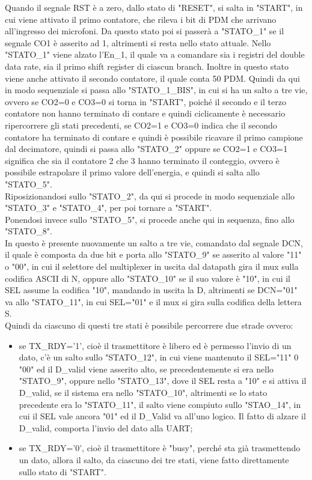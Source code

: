 \documentclass[a4paper, titlepage]{article}
\begin{document}
\noindent Quando il segnale RST è a zero, dallo stato di "RESET", si salta in "START", in cui viene attivato il primo contatore, che rileva i bit di PDM che arrivano all'ingresso dei microfoni. Da questo stato poi si passerà a "STATO\_1" se il segnale CO1 è asserito ad 1, altrimenti si resta nello stato attuale. Nello "STATO\_1" viene alzato l'En\_1, il quale va a comandare sia i registri del double data rate, sia il primo shift register di ciascun branch. Inoltre in questo stato viene anche attivato il secondo contatore, il quale conta 50 PDM. Quindi da qui in modo sequenziale si passa allo "STATO\_1\_BIS", in cui si ha un salto a tre vie, ovvero se CO2=0 e CO3=0 si torna in "START", poiché il secondo e il terzo contatore non hanno terminato di contare e quindi ciclicamente è necessario ripercorrere gli stati precedenti, se CO2=1 e CO3=0 indica che il secondo contatore ha terminato di contare e quindi è possibile ricavare il primo campione dal decimatore, quindi si passa allo "STATO\_2" oppure se CO2=1 e CO3=1 significa che sia il contatore 2 che 3 hanno terminato il conteggio, ovvero è possibile estrapolare il primo valore dell'energia, e quindi si salta allo "STATO\_5".\\Riposizionandosi sullo "STATO\_2", da qui si procede in modo sequenziale allo "STATO\_3" e "STATO\_4", per poi tornare a "START".\\Ponendosi invece sullo "STATO\_5", si procede anche qui in sequenza, fino allo "STATO\_8".\\In questo è presente nuovamente un salto a tre vie, comandato dal segnale DCN, il quale è composta da due bit e porta allo "STATO\_9" se asserito al valore "11" o "00", in cui il selettore del multiplexer in uscita dal datapath gira il mux sulla codifica ASCII di N, oppure allo "STATO\_10" se il suo valore è "10", in cui il SEL assume la codifica "10", mandando in uscita la D, altrimenti se DCN="01" va allo "STATO\_11", in cui SEL="01" e il mux si gira sulla codifica della lettera S.\\ Quindi da ciascuno di questi tre stati è possibile percorrere due strade ovvero:
\begin{itemize}
\item se TX\_RDY='1', cioè il trasmettitore è libero ed è permesso l'invio di un dato, c'è un salto sullo "STATO\_12", in cui viene mantenuto il SEL="11" 0 "00" ed il D\_valid viene asserito alto, se precedentemente si era nello "STATO\_9", oppure nello "STATO\_13", dove il SEL resta a "10" e si attiva il D\_valid, se il sistema era nello "STATO\_10", altrimenti se lo stato precedente era lo "STATO\_11", il salto viene compiuto sullo "STAO\_14", in cui il SEL vale ancora "01" ed il D\_Valid va all'uno logico. Il fatto di alzare il D\_valid, comporta l'invio del dato alla UART;
\item se TX\_RDY='0', cioè il trasmettitore è "busy", perché sta già trasmettendo un dato, allora il salto, da ciascuno dei tre stati, viene fatto direttamente sullo stato di "START".
\end{itemize}
\end{document}
